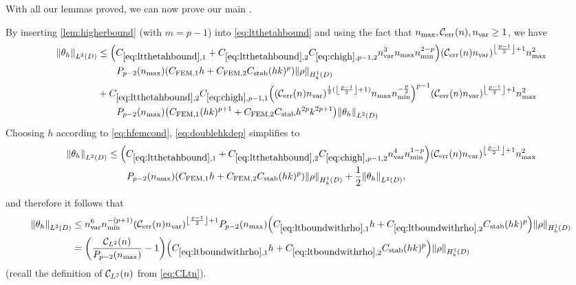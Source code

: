 With all our lemmas proved, we can now prove our main .

\label{page:thmfembound}
By inserting \cref{lem:higherbound} (with $m=p-1$) into \cref{eq:ltthetahbound} and using the fact that $\nmax, \En, \nvar \geq 1$, we have
\begin{align}
\NLtD{\thetah}&\leq \mleft(\Cfirst + \Csecond\Chighfn{p-1,2} \nvar^3\nmax\nmin^{2-p} \mright)\mleft(\En \nvar\mright)^{\floor{\frac{p-1}2}+1}\nmax^2\nonumber\\
&\quad\quad\Pfn{p-2}\mleft(\nmax\mright)\mleft(\CFEMotilde h + \CFEMttilde \CAnk (hk)^p\mright)\NHokD{\rho}\nonumber\\
&+\Csecond  \Chighfn{p-1,1} \mleft(\mleft(\En\nvar\mright)^{\half(\floor{\frac{p-1}2}+1)}\nmax\nmin^{-\frac{p}2}\mright)^{p-1}\mleft(\En \nvar\mright)^{\floor{\frac{p-1}2}+1}\nmax^2\nonumber\\
&\quad\quad\Pfn{p-2}\mleft(\nmax\mright)\mleft(\CFEMotilde (hk )^{p+1}+ \CFEMttilde \CAnk h^{2p}k^{2p+1}\mright)\NLtD{\thetah}\label{eq:doublehkdep}
\end{align}
Choosing $h$ according to \cref{eq:hfemcond}, \cref{eq:doublehkdep} simplifies to
\begin{align*}
\NLtD{\thetah} &\leq \mleft(\Cfirst + \Csecond\Chighfn{p-1,2} \nvar^4\nmin^{1-p} \mright)\mleft(\En \nvar\mright)^{\floor{\frac{p-1}2}+1}\nmax^2\\
&\quad\quad\Pfn{p-2}\mleft(\nmax\mright)\mleft(\CFEMotilde h + \CFEMttilde \CAnk (hk)^p\mright)\NHokD{\rho} + \half \NLtD{\thetah},
\end{align*}

and therefore it follows that
\begin{align}
  \NLtD{\thetah} &\leq \nvar^6\nmin^{-(p+1)} \mleft(\En \nvar\mright)^{\floor{\frac{p-1}2}+1} \Pfn{p-2}\mleft(\nmax\mright)\mleft(\CLtboundo h + \CLtboundt  \CAnk (hk)^p\mright)\NHokD{\rho}\label{eq:ltboundwithrho}\\
  &= \mleft(\frac{\CLtn(n)}{\Pfn{p-2}\mleft(\nmax\mright)}-1\mright)\mleft(\CLtboundo h + \CLtboundt  \CAnk (hk)^p\mright)\NHokD{\rho}\label{eq:ltboundwithrho2}
\end{align}
(recall the definition of $\mathcal C_{L^{2}}(n)$ from \cref{eq:CLtn}).

